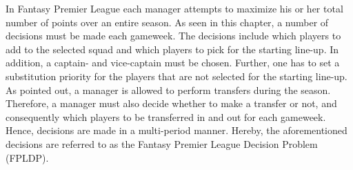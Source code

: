 In Fantasy Premier League each manager attempts to maximize his or her total number of points over an entire season. As seen in this chapter, a number of decisions must be made each gameweek. The decisions include which players to add to the selected squad and which players to pick for the starting line-up. In addition, a captain- and vice-captain must be chosen. Further, one has to set a substitution priority for the players that are not selected for the starting line-up. As pointed out, a manager is allowed to perform transfers during the season. Therefore, a manager must also decide whether to make a transfer or not, and consequently which players to be transferred in and out for each gameweek. Hence, decisions are made in a multi-period manner. Hereby, the aforementioned decisions are referred to as the Fantasy Premier League Decision Problem (FPLDP).